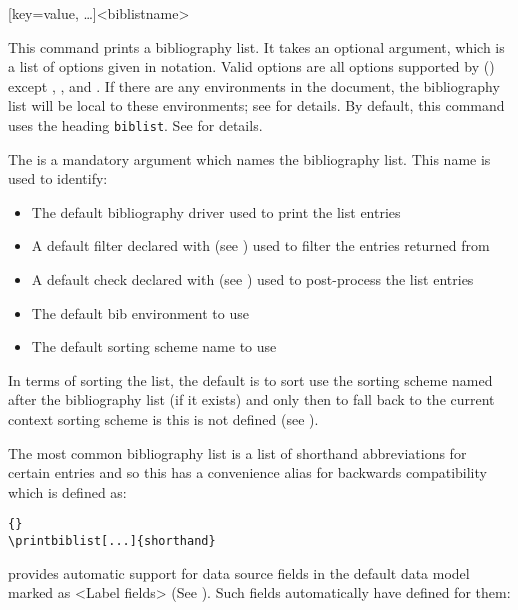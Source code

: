\begin{ltxsyntax}

[key=value, \dots]{<biblistname>}

This command prints a bibliography list. It takes an optional argument, which is a list of options given in \keyval notation. Valid options are all options supported by  () except , , and . If there are any  environments in the document, the bibliography list will be local to these environments; see  for details. By default, this command uses the heading \texttt{biblist}. See  for details.

The  is a mandatory argument which names the bibliography list. This name is used to identify:
\begin{itemize}
\item The default bibliography driver used to print the list entries
\item A default filter declared with  (see ) used to filter the entries returned from \biber
\item A default check declared with  (see ) used to post-process the list entries
\item The default bib environment to use
\item The default sorting scheme name to use
\end{itemize}

In terms of sorting the list, the default is to sort use the sorting scheme named after the bibliography list (if it exists) and only then to fall back to the current context sorting scheme is this is not defined (see ).

The most common bibliography list is a list of shorthand abbreviations for certain entries and so this has a convenience alias  for backwards compatibility which is defined as:

\begin{lstlisting}[style=latex]{}
\printbiblist[...]{shorthand}
\end{lstlisting}

\biblatex provides automatic support for data source fields in the default data model marked as <Label fields> (See ). Such fields automatically have defined for them:


\end{ltxsyntax}
